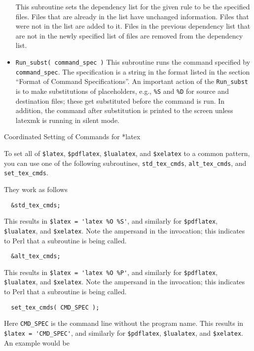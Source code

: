 \begin{itemize}
This subroutine sets the dependency list for the given  rule  to
be the specified files.  Files that are already in the list have unchanged
information.  Files that were  not  in  the  list  are added to
it.  Files in the previous dependency list that are not in the
newly specified list of files are removed from the dependency
list.

\item \verb|Run_subst( command_spec )|
This subroutine runs the command specified by \verb|command_spec|.  The
specification is a string in the format listed  in  the  section
``Format  of Command Specifications''.  An important action of the
\verb|Run_subst| is to make substitutions of placeholders, e.g., \verb|%S| and
\verb|%D|  for  source and destination files; these get
substituted before the command is run.  In addition, the
command after substitution  is  printed  to  the screen unless
latexmk is running in silent mode.

\end{itemize}


Coordinated Setting of Commands for *latex

To set all of \verb|$latex|, \verb|$pdflatex|, \verb|$lualatex|, and \verb|$xelatex|  to  a  common
pattern,  you  can  use one of the following subroutines, \verb|std_tex_cmds|,
\verb|alt_tex_cmds|, and \verb|set_tex_cmds|.

They work as follows

\begin{verbatim}
  &std_tex_cmds;
\end{verbatim}

This results in \verb|$latex = 'latex %O %S'|, and  similarly  for  \verb|$pdflatex|,
\verb|$lualatex|,  and  \verb|$xelatex|.   Note the ampersand in the invocation; this
indicates to Perl that a subroutine is being called.

\begin{verbatim}
  &alt_tex_cmds;
\end{verbatim}

This results in \verb|$latex = 'latex %O %P'|, and  similarly  for
\verb|$pdflatex|, \verb|$lualatex|,  and  \verb|$xelatex|.   Note the ampersand
in the invocation; this indicates to Perl that a subroutine is being called.

\begin{verbatim}
  set_tex_cmds( CMD_SPEC );
\end{verbatim}

Here \verb|CMD_SPEC| is the command line without the program  name.  This  results in
\verb|$latex = 'CMD_SPEC'|, and similarly for \verb|$pdflatex|,
\verb|$lualatex|, and \verb|$xelatex|.
An example would be

